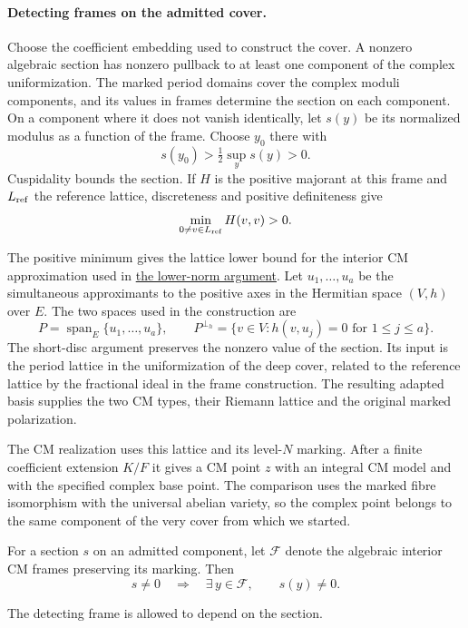 \paragraph{Detecting frames on the admitted cover.}
Choose the coefficient embedding used to construct the cover.
A nonzero algebraic section has nonzero pullback to at least one component of the complex uniformization. The marked period domains cover the complex moduli
components, and its values in frames determine the section on each component. On a component where it does not vanish identically, let \(s(y)\) be its normalized modulus as a function of the frame. Choose \(y_0\) there with
\[
 s(y_0)>\tfrac12\sup_y s(y)>0.
\]
Cuspidality bounds the section. If \(H\) is the positive majorant at this frame and \(L_{\rm ref}\) the reference lattice, discreteness and positive definiteness give 
\[
 \min_{0\ne v\in L_{\rm ref}}H(v,v)>0.
\]

The positive minimum gives the lattice lower bound for the interior CM approximation used in
\hyperref[subsec:deep-cm-interior]{the lower-norm argument}.
Let \(u_1,\ldots,u_a\) be the simultaneous approximants to the positive axes
in the Hermitian space \((V,h)\) over \(E\). The two spaces used in the construction are
\[
 P=\operatorname{span}_E\{u_1,\ldots,u_a\},\qquad
 P^{\perp_h}=\{v\in V:h(v,u_j)=0\text{ for }1\le j\le a\}.
\]
The short-disc argument preserves the nonzero value of the section. Its input is the
period lattice in the uniformization of the deep cover, related to
the reference lattice by the fractional ideal in the frame
construction. The resulting adapted basis supplies the two CM
types, their Riemann lattice and the original marked polarization.

The CM realization uses this lattice and its level-\(N\) marking.
After a finite coefficient extension \(K/F\) it gives a CM point
\(z\) with an integral CM model and with the specified complex base
point. The comparison uses the marked fibre isomorphism with the
universal abelian variety, so the complex point belongs to the
same component of the very cover from which we started.
\label{cor:deep-cover-denominators-1}

\begin{lemma}
\label{lem:deep-cover-detecting-frames}
For a section \(s\) on an admitted component, let \(\mathcal F\) denote the algebraic interior CM frames preserving its marking. Then
\[
 s\ne0\quad\Longrightarrow\quad \exists\,y\in\mathcal F,\qquad s(y)\ne0.
\]

The detecting frame is allowed to depend on the section.
\end{lemma}

